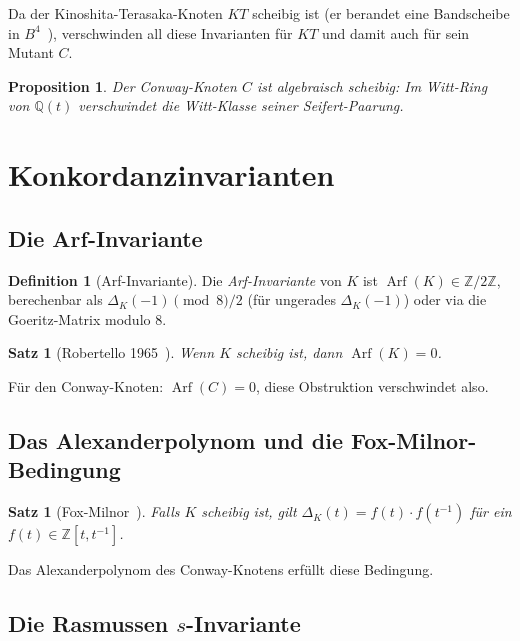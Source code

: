 \documentclass[12pt,a4paper]{amsart}
\newtheorem{proposition}[theorem]{Proposition}
\newtheorem{satz}[theorem]{Satz}
\theoremstyle{definition}
\newtheorem{definition_de}[theorem]{Definition}
\theoremstyle{remark}
\DeclareMathOperator{\Arf}{Arf}
\newcommand{\Z}{\mathbb{Z}}
\newcommand{\Q}{\mathbb{Q}}
\begin{document}
Da der Kinoshita-Terasaka-Knoten $KT$ scheibig ist (er berandet eine
Bandscheibe in $B^4$~\cite{KinoshitaTerasaka1957}), verschwinden all diese
Invarianten für $KT$ und damit auch für sein Mutant $C$.

\begin{proposition}
Der Conway-Knoten $C$ ist algebraisch scheibig: Im Witt-Ring von $\Q(t)$
verschwindet die Witt-Klasse seiner Seifert-Paarung.
\end{proposition}

\section{Konkordanzinvarianten}

\subsection{Die Arf-Invariante}

\begin{definition_de}[Arf-Invariante]
Die \emph{Arf-Invariante} von $K$ ist $\Arf(K) \in \Z/2\Z$,
berechenbar als $\Delta_K(-1) \pmod{8}/2$ (für ungerades $\Delta_K(-1)$)
oder via die Goeritz-Matrix modulo 8.
\end{definition_de}

\begin{satz}[Robertello 1965~\cite{Robertello1965}]
Wenn $K$ scheibig ist, dann $\Arf(K) = 0$.
\end{satz}

Für den Conway-Knoten: $\Arf(C) = 0$, diese Obstruktion verschwindet also.

\subsection{Das Alexanderpolynom und die Fox-Milnor-Bedingung}

\begin{satz}[Fox-Milnor~\cite{FoxMilnor1966}]
Falls $K$ scheibig ist, gilt $\Delta_K(t) = f(t) \cdot f(t^{-1})$
für ein $f(t) \in \Z[t, t^{-1}]$.
\end{satz}

Das Alexanderpolynom des Conway-Knotens erfüllt diese Bedingung.

\subsection{Die Rasmussen $s$-Invariante}
\end{document}
